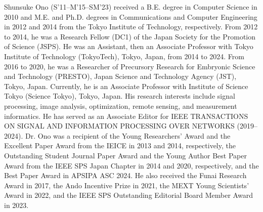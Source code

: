 \documentclass[10pt,journal]{IEEEtran}
\begin{document}
\begin{IEEEbiography}{Shunsuke Ono}
(S’11–M’15–SM'23) received a B.E. degree in Computer Science in 2010 and M.E. and Ph.D. degrees in Communications and Computer Engineering in 2012 and 2014 from the Tokyo Institute of Technology, respectively. From 2012 to 2014, he was a Research Fellow (DC1) of the Japan Society for the Promotion of Science (JSPS). He was an Assistant, then an Associate Professor with Tokyo Institute of Technology (TokyoTech), Tokyo, Japan, from 2014 to 2024. From 2016 to 2020, he was a Researcher of Precursory Research for Embryonic Science and Technology (PRESTO), Japan Science and Technology Agency (JST), Tokyo, Japan. Currently, he is an Associate Professor with Institute of Science Tokyo (Science Tokyo), Tokyo, Japan. His research interests include signal processing, image analysis, optimization, remote sensing, and measurement informatics. He has served as an Associate Editor for IEEE TRANSACTIONS ON SIGNAL AND INFORMATION PROCESSING OVER NETWORKS (2019--2024). Dr. Ono was a recipient of the Young Researchers’ Award and the Excellent Paper Award from the IEICE in 2013 and 2014, respectively, the Outstanding Student Journal Paper Award and the Young Author Best Paper Award from the IEEE SPS Japan Chapter in 2014 and 2020, respectively, and the Best Paper Award in APSIPA ASC 2024. He also received the Funai Research Award in 2017, the Ando Incentive Prize in 2021, the MEXT Young Scientists’ Award in 2022, and the IEEE SPS Outstanding Editorial Board Member Award in 2023. 
\end{IEEEbiography}




\vfill
\end{document}

